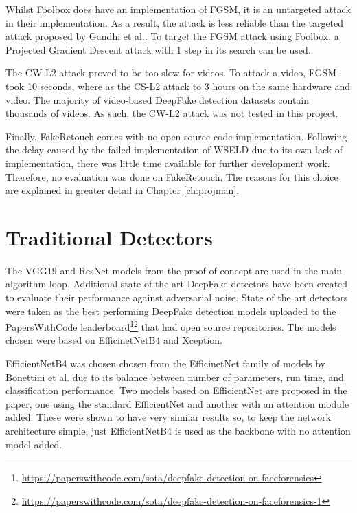 Whilst Foolbox does have an implementation of FGSM, it is an untargeted attack in their implementation. As a result, the attack is less reliable than the targeted attack proposed by Gandhi et al.\cite{gandhi2020adversarial}. To target the FGSM attack using Foolbox, a Projected Gradient Descent attack with 1 step in its search can be used\cite{madry2017towards}. 

The CW-L2 attack proved to be too slow for videos. To attack a video, FGSM took 10 seconds, where as the CS-L2 attack to 3 hours on the same hardware and video. The majority of video-based DeepFake detection datasets contain thousands of videos. As such, the CW-L2 attack was not tested in this project.

Finally, FakeRetouch comes with no open source code implementation. Following the delay caused by the failed implementation of WSELD due to its own lack of implementation, there was little time available for further development work. Therefore, no evaluation was done on FakeRetouch. The reasons for this choice are explained in greater detail in Chapter \ref{ch:projman}.

\section{Traditional Detectors}
\label{sec:traditional-detectors}

The VGG19\cite{krishna2022deepfake}\cite{yadav2024deepfake} and ResNet\cite{tiwari2024deepfake} models from the proof of concept are used in the main algorithm loop. Additional state of the art DeepFake detectors have been created to evaluate their performance against adversarial noise. State of the art detectors were taken as the best performing DeepFake detection models uploaded to the PapersWithCode leaderboard\footnote{\url{https://paperswithcode.com/sota/deepfake-detection-on-faceforensics}}\footnote{\url{https://paperswithcode.com/sota/deepfake-detection-on-faceforensics-1}} that had open source repositories. The models chosen were based on EfficinetNetB4\cite{bonettini2021video} and Xception\cite{roessler2019faceforensicspp}.

EfficientNetB4 was chosen chosen from the EfficinetNet family of models by Bonettini et al. due to its balance between number of parameters, run time, and classification performance. Two models based on EfficientNet are proposed in the paper, one using the standard EfficientNet and another with an attention module added. These were shown to have very similar results so, to keep the network architecture simple, just EfficientNetB4 is used as the backbone with no attention model added.

